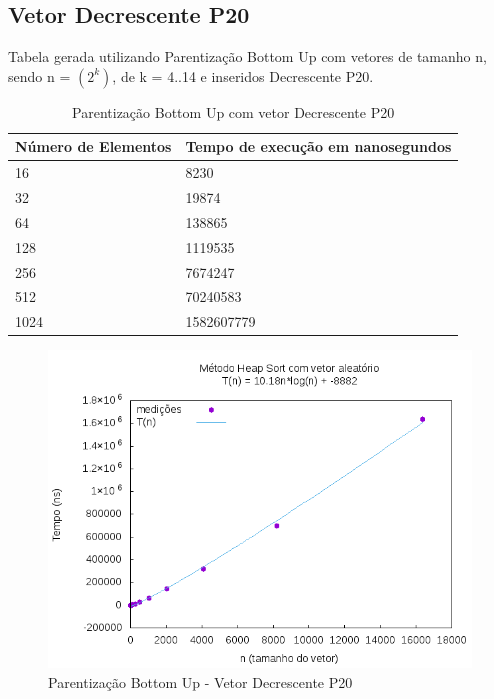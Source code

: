 \documentclass[12pt,a4paper,twoside]{report}
\begin{document}
\subsection{Vetor Decrescente P20}
Tabela gerada utilizando Parentização Bottom Up com vetores de tamanho n, sendo n = $(2^k)$, de k = 4..14 e inseridos Decrescente P20.
\begin{table}[H]
\centering
\caption{Parentização Bottom Up com vetor Decrescente P20}
\label{my-label}
\begin{tabular}{|l|l|}
\hline
\multicolumn{1}{|c|}{\textbf{Número de Elementos}} & \multicolumn{1}{c|}{\textbf{Tempo de execução em nanosegundos}} \\ \hline
16 & 8230 \\ \hline
32 & 19874 \\ \hline
64 & 138865 \\ \hline
128 & 1119535 \\ \hline
256 & 7674247 \\ \hline
512 & 70240583 \\ \hline
1024 & 1582607779 \\ \hline
\end{tabular}
\end{table}

\begin{figure}[H]
    \centering
    \includegraphics[width=0.7\linewidth]{graficos/HeapSort/vIntAleatorio/vIntAleatorio.png}
  \caption{Parentização Bottom Up - Vetor Decrescente P20}
\end{figure}
\end{document}
